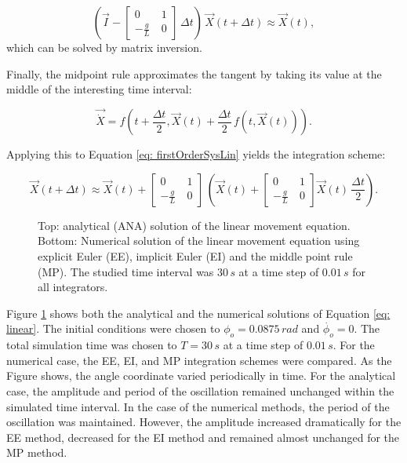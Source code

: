 \documentclass[12pt,bibstyle=none,pagenumberinfooter]{ifmdocument}
\begin{document}
\begin{equation}
    \left(\vec{I} - \begin{bmatrix}
        0 & 1 \\ -\frac{g}{L}\ & 0 
        \end{bmatrix}\,\Delta t \right)\,\Vec{X}(t+\Delta t) \approx \Vec{X}(t),
\end{equation}
which can be solved by matrix inversion.

Finally, the midpoint rule approximates the tangent by taking its value at the middle of the interesting time interval:

\begin{equation}
    \Vec{\Dot{X}} = f\left( t+\frac{\Delta t}{2}, \Vec{X}(t) + \frac{\Delta t}{2}\,f\left(t, \Vec{X}(t)\right) \right).
\end{equation}

Applying this to Equation \ref{eq: firstOrderSysLin} yields the integration scheme:

\begin{equation}
    \Vec{X}(t+\Delta t) \approx \vec{X}(t) + \begin{bmatrix}
        0 & 1 \\ -\frac{g}{L}\ & 0 
        \end{bmatrix}\,\left(\Vec{X}(t) + \begin{bmatrix}
        0 & 1 \\ -\frac{g}{L}\ & 0 
        \end{bmatrix} \Vec{X}(t)\, \frac{\Delta t}{2} \right).
\end{equation}


\begin{figure}[h]
    \centering
    \setlength{\figH}{0.3\textheight}
    \setlength{\figW}{0.6\textwidth}
    
    \caption{Top: analytical (ANA) solution of the linear movement equation. Bottom: Numerical solution of the linear movement equation using explicit Euler (EE), implicit Euler (EI) and the middle point rule (MP). The studied time interval was $30\,s$ at a time step of $0.01\,s$ for all integrators.}
    \label{fig:LinSolutions}
\end{figure}

Figure \ref{fig:LinSolutions} shows both the analytical and the numerical solutions of Equation \ref{eq: linear}. The initial conditions were chosen to $\phi_o = 0.0875\,rad$ and $\Dot{\phi_o}= 0$. The total simulation time was chosen to $T = 30\,s$ at a time step of $0.01\,s$. For the numerical case, the EE, EI, and MP integration schemes were compared. As the Figure shows, the angle coordinate varied periodically in time. For the analytical case, the amplitude and period of the oscillation remained unchanged within the simulated time interval. In the case of the numerical methods, the period of the oscillation was maintained. However, the amplitude increased dramatically for the EE method, decreased for the EI method and remained almost unchanged for the MP method. 
\end{document}
